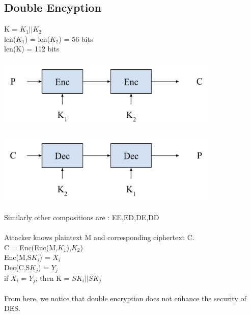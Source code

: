 \documentclass[11pt]{article}
\begin{document}
\subsection*{Double Encyption}
K = $K_{1} || K_{2}$ \\
len($K_{1}$) = len($K_{2}$) = 56 bits \\
len(K) = 112 bits \\ \\
\includegraphics[width=300pt]{p1.png} \\ \\
\includegraphics[width=300pt]{p2.png} \\ \\
Similarly other compositions are : EE,ED,DE,DD \\ \\
Attacker knows plaintext M and corresponding ciphertext C. \\
C = Enc(Enc(M,$K_{1}$),$K_{2}$) \\
Enc(M,S$K_{i}$) = $X_{i}$ \\
Dec(C,S$K_{j}$) = $Y_{j}$ \\
if $X_{i}$ = $Y_{j}$, then K = $SK_{i} || SK_{j}$ \\ \\
From here, we notice that double encryption does not enhance the security of DES. \\
\end{document}
